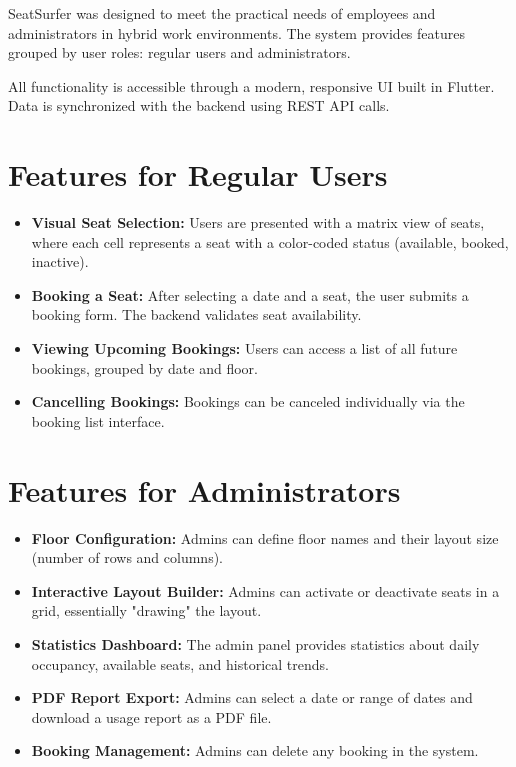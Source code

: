 \documentclass[12pt,a4paper]{report}
\begin{document}
SeatSurfer was designed to meet the practical needs of employees and administrators in hybrid work environments. The system provides features grouped by user roles: regular users and administrators.

All functionality is accessible through a modern, responsive UI built in Flutter. Data is synchronized with the backend using REST API calls.

\section{Features for Regular Users}

\begin{itemize}
    \item \textbf{Visual Seat Selection:} Users are presented with a matrix view of seats, where each cell represents a seat with a color-coded status (available, booked, inactive).
    \item \textbf{Booking a Seat:} After selecting a date and a seat, the user submits a booking form. The backend validates seat availability.
    \item \textbf{Viewing Upcoming Bookings:} Users can access a list of all future bookings, grouped by date and floor.
    \item \textbf{Cancelling Bookings:} Bookings can be canceled individually via the booking list interface.
\end{itemize}

\section{Features for Administrators}

\begin{itemize}
    \item \textbf{Floor Configuration:} Admins can define floor names and their layout size (number of rows and columns).
    \item \textbf{Interactive Layout Builder:} Admins can activate or deactivate seats in a grid, essentially "drawing" the layout.
    \item \textbf{Statistics Dashboard:} The admin panel provides statistics about daily occupancy, available seats, and historical trends.
    \item \textbf{PDF Report Export:} Admins can select a date or range of dates and download a usage report as a PDF file.
    \item \textbf{Booking Management:} Admins can delete any booking in the system.
\end{itemize}
\end{document}
